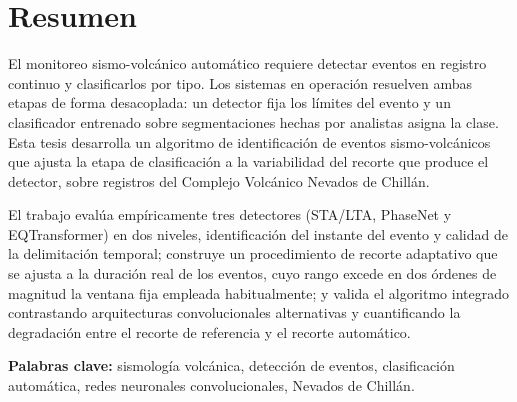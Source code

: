 \chapter*{Resumen}

El monitoreo sismo-volcánico automático requiere detectar eventos en
registro continuo y clasificarlos por tipo. Los sistemas en operación
resuelven ambas etapas de forma desacoplada: un detector fija los límites
del evento y un clasificador entrenado sobre segmentaciones hechas por
analistas asigna la clase. Esta tesis desarrolla un algoritmo de
identificación de eventos sismo-volcánicos que ajusta la etapa de
clasificación a la variabilidad del recorte que produce el detector, sobre
registros del Complejo Volcánico Nevados de Chillán.

El trabajo evalúa empíricamente tres detectores (STA/LTA, PhaseNet y
EQTransformer) en dos niveles, identificación del instante del evento y
calidad de la delimitación temporal; construye un procedimiento de recorte
adaptativo que se ajusta a la duración real de los eventos, cuyo rango
excede en dos órdenes de magnitud la ventana fija empleada habitualmente; y
valida el algoritmo integrado contrastando arquitecturas convolucionales
alternativas y cuantificando la degradación entre el recorte de referencia
y el recorte automático.

\vspace{1cm}
\noindent\textbf{Palabras clave:} sismología volcánica, detección de
eventos, clasificación automática, redes neuronales convolucionales,
Nevados de Chillán.